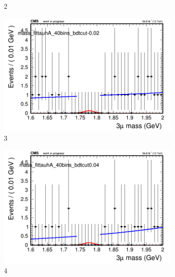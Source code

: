 \begin{figure}[h!]
\begin{subfigure}{0.2\textwidth}
        \caption{2}
    \end{subfigure}
    \begin{subfigure}{0.2\textwidth}
        \includegraphics[width=\textwidth]{unfixed_exp/plots/tauhA/massfit_tauhA_40bins_bdtcut-0.02.png}
        \caption{3}
    \end{subfigure}
    \begin{subfigure}{0.2\textwidth}
        \includegraphics[width=\textwidth]{unfixed_exp/plots/tauhA/massfit_tauhA_40bins_bdtcut0.04.png}
        \caption{4}
    \end{subfigure}
    \begin{subfigure}{0.2\textwidth}

\end{subfigure}
\end{figure}
